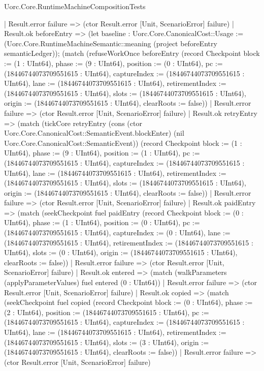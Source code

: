 \begin{lexlean}{Uorc.Core.RuntimeMachineCompositionTests}
\begin{semanticmodule}
{      | Result.error failure => (ctor Result.error [Unit, ScenarioError] failure)
      | Result.ok beforeEntry => (let baseline : Uorc.Core.CanonicalCost::Usage := (Uorc.Core.RuntimeMachineSemantic::meaning (project beforeEntry semanticLedger)); (match (refuseWorkOnce beforeEntry (record Checkpoint {block := (1 : UInt64), phase := (9 : UInt64), position := (0 : UInt64), pc := (18446744073709551615 : UInt64), captureIndex := (18446744073709551615 : UInt64), lane := (18446744073709551615 : UInt64), retirementIndex := (18446744073709551615 : UInt64), slots := (18446744073709551615 : UInt64), origin := (18446744073709551615 : UInt64), clearRoots := false}))
        | Result.error failure => (ctor Result.error [Unit, ScenarioError] failure)
        | Result.ok retryEntry => (match (tickCore retryEntry (cons (ctor Uorc.Core.CanonicalCost::SemanticEvent.blockEnter) (nil Uorc.Core.CanonicalCost::SemanticEvent)) (record Checkpoint {block := (1 : UInt64), phase := (9 : UInt64), position := (1 : UInt64), pc := (18446744073709551615 : UInt64), captureIndex := (18446744073709551615 : UInt64), lane := (18446744073709551615 : UInt64), retirementIndex := (18446744073709551615 : UInt64), slots := (18446744073709551615 : UInt64), origin := (18446744073709551615 : UInt64), clearRoots := false}))
          | Result.error failure => (ctor Result.error [Unit, ScenarioError] failure)
          | Result.ok paidEntry => (match (seekCheckpoint fuel paidEntry (record Checkpoint {block := (0 : UInt64), phase := (1 : UInt64), position := (0 : UInt64), pc := (18446744073709551615 : UInt64), captureIndex := (0 : UInt64), lane := (18446744073709551615 : UInt64), retirementIndex := (18446744073709551615 : UInt64), slots := (0 : UInt64), origin := (18446744073709551615 : UInt64), clearRoots := false}))
            | Result.error failure => (ctor Result.error [Unit, ScenarioError] failure)
            | Result.ok entered => (match (walkParameters (applyParameterValues) fuel entered (0 : UInt64))
              | Result.error failure => (ctor Result.error [Unit, ScenarioError] failure)
              | Result.ok copied => (match (seekCheckpoint fuel copied (record Checkpoint {block := (0 : UInt64), phase := (2 : UInt64), position := (18446744073709551615 : UInt64), pc := (18446744073709551615 : UInt64), captureIndex := (18446744073709551615 : UInt64), lane := (18446744073709551615 : UInt64), retirementIndex := (18446744073709551615 : UInt64), slots := (3 : UInt64), origin := (18446744073709551615 : UInt64), clearRoots := false}))
                | Result.error failure => (ctor Result.error [Unit, ScenarioError] failure)
}
\end{semanticmodule}
\end{lexlean}
